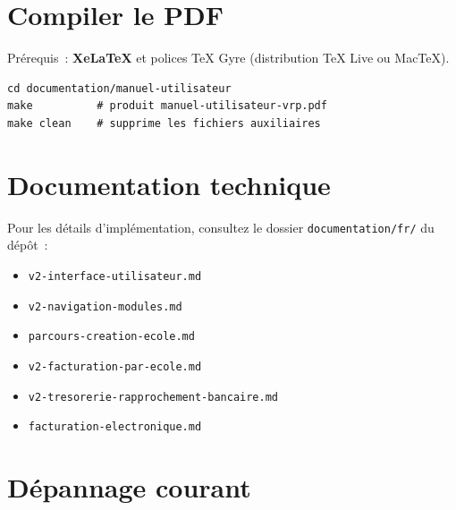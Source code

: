 \section{Compiler le PDF}

Prérequis~: \textbf{XeLaTeX} et polices TeX Gyre (distribution TeX Live ou MacTeX).

\begin{verbatim}
cd documentation/manuel-utilisateur
make          # produit manuel-utilisateur-vrp.pdf
make clean    # supprime les fichiers auxiliaires
\end{verbatim}

\section{Documentation technique}

Pour les détails d'implémentation, consultez le dossier \texttt{documentation/fr/} du dépôt~:

\begin{itemize}[leftmargin=*]
  \item \texttt{v2-interface-utilisateur.md}
  \item \texttt{v2-navigation-modules.md}
  \item \texttt{parcours-creation-ecole.md}
  \item \texttt{v2-facturation-par-ecole.md}
  \item \texttt{v2-tresorerie-rapprochement-bancaire.md}
  \item \texttt{facturation-electronique.md}
\end{itemize}

\section{Dépannage courant}

